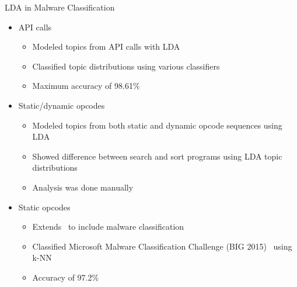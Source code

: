 \documentclass[handout,11pt]{beamer}
\begin{document}
	\begin{frame}{LDA in Malware Classification}
		\begin{itemize}
			\item API calls~\cite{sundarkumarMalwareDetection2015}
				\begin{itemize}
					\item Modeled topics from API calls with LDA
					\item Classified topic distributions using various classifiers
					\item Maximum accuracy of 98.61\%
				\end{itemize}
			\item Static/dynamic opcodes~\cite{greerUnsupervisedInterpretable2019}
				\begin{itemize}
					\item Modeled topics from both static and dynamic opcode sequences
						using LDA
					\item Showed difference between search and sort programs using LDA
						topic distributions
					\item Analysis was done manually
				\end{itemize}
			\item Static opcodes~\cite{djaneye-boundjouStaticAnalysis2019a}
				\begin{itemize}
					\item Extends~\cite{greerUnsupervisedInterpretable2019} to include
						malware classification
					\item Classified Microsoft Malware Classification Challenge (BIG
						2015)~\cite{ronenMicrosoftMalware2018} using k-NN
					\item Accuracy of 97.2\%
				\end{itemize}
		\end{itemize}
	\end{frame}
\end{document}
